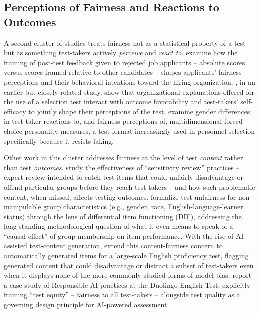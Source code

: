 \documentclass[11pt]{article}
\begin{document}
\subsection{Perceptions of Fairness and Reactions to Outcomes}

A second cluster of studies treats fairness not as a statistical property of a test but as something test-takers actively \emph{perceive} and \emph{react to}. \citet{feeney2022rejection} examine how the framing of post-test feedback given to rejected job applicants -- absolute scores versus scores framed relative to other candidates -- shapes applicants' fairness perceptions and their behavioral intentions toward the hiring organization. \citet{stierwalt2000explanations}, in an earlier but closely related study, show that organizational explanations offered for the use of a selection test interact with outcome favorability and test-takers' self-efficacy to jointly shape their perceptions of the test. \citet{zhou2024genderforced} examine gender differences in test-taker reactions to, and fairness perceptions of, multidimensional forced-choice personality measures, a test format increasingly used in personnel selection specifically because it resists faking.

Other work in this cluster addresses fairness at the level of test \emph{content} rather than test \emph{outcomes}. \citet{grand2013sensitivity} study the effectiveness of ``sensitivity review'' practices -- expert review intended to catch test items that could unfairly disadvantage or offend particular groups before they reach test-takers -- and how such problematic content, when missed, affects testing outcomes. \citet{suk2026unfairness} formalize test unfairness for non-manipulable group characteristics (e.g., gender, race, English-language-learner status) through the lens of differential item functioning (DIF), addressing the long-standing methodological question of what it even means to speak of a ``causal effect'' of group membership on item performance. With the rise of AI-assisted test-content generation, \citet{stowe2024fairness} extend this content-fairness concern to automatically generated items for a large-scale English proficiency test, flagging generated content that could disadvantage or distract a subset of test-takers even when it displays none of the more commonly studied forms of model bias. \citet{burstein2024responsible} report a case study of Responsible AI practices at the Duolingo English Test, explicitly framing ``test equity'' -- fairness to all test-takers -- alongside test quality as a governing design principle for AI-powered assessment.
\end{document}
